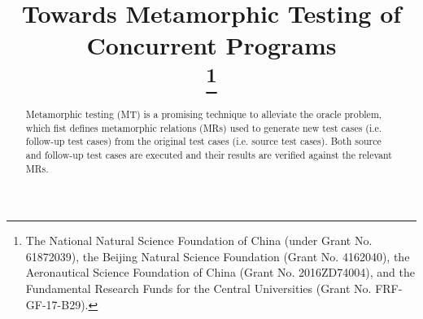 \documentclass[conference]{IEEEtran}
\theoremstyle{remark}
\begin{document}
\title{Towards Metamorphic Testing of Concurrent Programs\\
\thanks{The National Natural Science Foundation of China (under Grant No. 61872039),
the Beijing Natural Science Foundation (Grant No. 4162040),
the Aeronautical Science Foundation of China (Grant No. 2016ZD74004), and
the Fundamental Research Funds for the Central Universities (Grant No. FRF-GF-17-B29).}
}

\author{
\and
{}
\and
{}
\and
{}
}

\maketitle

\begin{abstract}
  Metamorphic testing (MT) is a promising technique to alleviate the oracle problem, which fist defines metamorphic relations (MRs) used to generate new test cases (i.e. follow-up
  test cases) from the original test cases (i.e. source test cases). Both source and follow-up test cases are executed and their results are verified against the relevant MRs.

\end{abstract}
\end{document}
